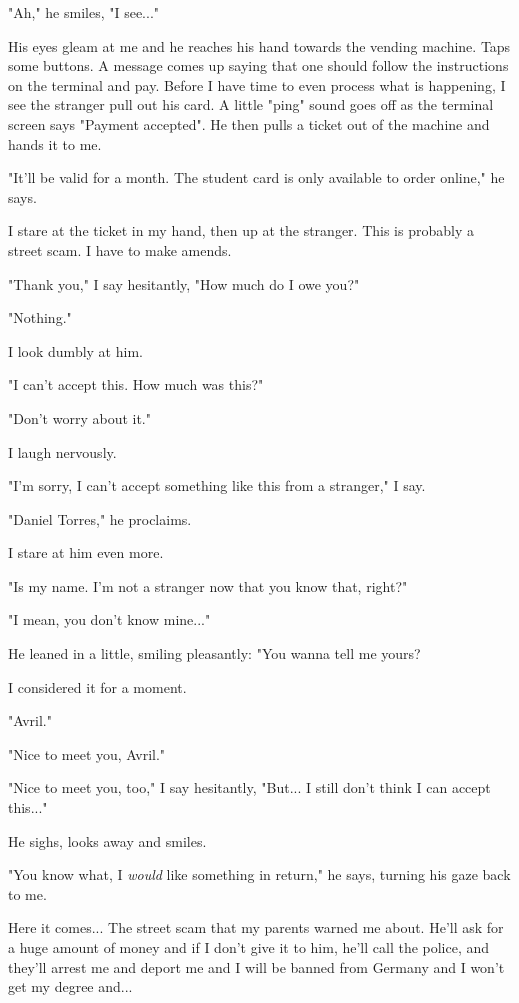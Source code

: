 "Ah," he smiles, "I see..."

His eyes gleam at me and he reaches his hand towards the vending machine. Taps some buttons. A message comes up saying that one should follow the instructions on the terminal and pay. Before I have time to even process what is happening, I see the stranger pull out his card. A little "ping" sound goes off as the terminal screen says "Payment accepted". He then pulls a ticket out of the machine and hands it to me.

"It'll be valid for a month. The student card is only available to order online," he says.

I stare at the ticket in my hand, then up at the stranger. This is probably a street scam. I have to make amends.

"Thank you," I say hesitantly, "How much do I owe you?"

"Nothing."

I look dumbly at him.

"I can't accept this. How much was this?"

"Don't worry about it."

I laugh nervously.

"I'm sorry, I can't accept something like this from a stranger," I say.

"Daniel Torres," he proclaims.

I stare at him even more.

"Is my name. I'm not a stranger now that you know that, right?"

"I mean, you don't know mine..."

He leaned in a little, smiling pleasantly: "You wanna tell me yours?

I considered it for a moment.

"Avril."

"Nice to meet you, Avril."

"Nice to meet you, too," I say hesitantly, "But... I still don't think I can accept this..."

He sighs, looks away and smiles.

"You know what, I \textit{would} like something in return," he says, turning his gaze back to me.

Here it comes... The street scam that my parents warned me about. He'll ask for a huge amount of money and if I don't give it to him, he'll call the police, and they'll arrest me and deport me and I will be banned from Germany and I won't get my degree and...

